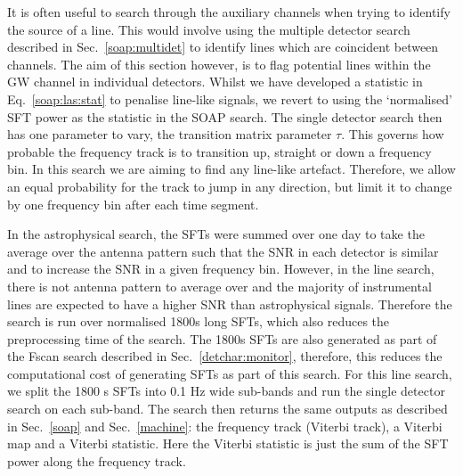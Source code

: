It is often useful to search through the auxiliary channels when trying to
identify the source of a line. 
This would involve using the multiple detector search described in Sec.~\ref{soap:multidet} to identify lines which are coincident between channels. 
The aim of this section however, is to flag potential lines within the \gls{GW} channel in individual detectors.
Whilst we have developed a statistic in Eq.~\ref{soap:las:stat} to penalise
line-like signals, we revert to using the
`normalised' \gls{SFT} power as the statistic in the SOAP search. The single
detector search then has one parameter to vary, the transition matrix
parameter $\tau$.  This governs how probable the frequency track is to transition up,
straight or down a frequency bin.  In this search we are aiming to find any line-like artefact.
Therefore, we allow an equal probability for the track to jump in any
direction, but limit it to change by one frequency bin after each time
segment.  

In the astrophysical search, the \glspl{SFT} were summed over one day to take the average over the antenna pattern such that the \gls{SNR} in each detector is similar and to increase the \gls{SNR} in a given frequency bin.
However, in the line search, there is not antenna pattern to average over and the majority of instrumental lines are expected to have a higher \gls{SNR} than astrophysical signals.
Therefore the search is run over normalised 1800s long \glspl{SFT}, which also reduces the preprocessing time of the search.
The 1800s \glspl{SFT} are also generated as part of the Fscan search described in Sec.~\ref{detchar:monitor}, therefore, this reduces the computational cost of generating \glspl{SFT} as part of this search. 
For this line search, we split the 1800 s \glspl{SFT} into 0.1 Hz wide sub-bands and run the single detector search on each sub-band. 
The search then returns the same outputs as described in
Sec.~\ref{soap} and Sec.~\ref{machine}: the frequency track (Viterbi track), a
Viterbi map and a Viterbi statistic.  Here the Viterbi statistic is just the
sum of the \gls{SFT} power along the frequency track.~  

